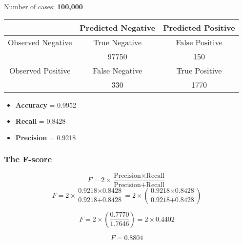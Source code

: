 \documentclass[a4]{beamer}
\begin{document}
\begin{frame}
	\Large
	Number of cases: \textbf{100,000}\\ 
%		
{
	\large
	\begin{center}
		\begin{tabular}{|c|c|c|}
			\hline  & Predicted Negative & Predicted Positive \\ 
			\hline Observed Negative & True Negative & False Positive \\
			& 97750 & 150  
			\\
			\hline Observed Positive & False Negative & True Positive \\ 
			& 330 & 1770  \\
			\hline 
		\end{tabular} 
	\end{center}
}
	\begin{itemize}
		\item \textbf{Accuracy} = 0.9952
		\item \textbf{Recall} = 0.8428
		\item \textbf{Precision} = 0.9218
	\end{itemize}
\end{frame}
\begin{frame}
	\frametitle{The F-score}
	\Large
	\[ F = 2 \times \frac{\mbox{Precision} \times \mbox{Recall}}{\mbox{Precision} + \mbox{Recall}}\]\bigskip
	\[ F = 2 \times \frac{\mbox{0.9218} \times \mbox{0.8428}}{\mbox{0.9218} + \mbox{0.8428}} = 2 \times \left( \frac{\mbox{0.9218} \times \mbox{0.8428}}{\mbox{0.9218} + \mbox{0.8428}} \right)\]



	
	\[ F = 2 \times \left( \frac{0.7770}{1.7646} \right) = 2 \times 0.4402 \]
		
		\[F = 0.8804\] 
	
\end{frame}



\end{document}
